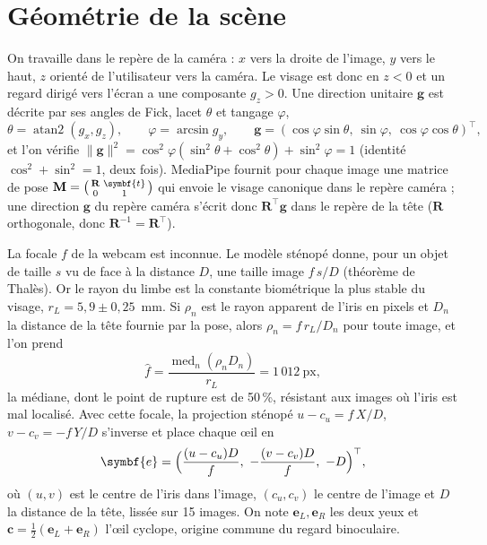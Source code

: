 \documentclass[10pt,a4paper]{article}
\newcommand{\vect}[1]{\symbf{#1}}
\newcommand{\T}{^{\top}}
\DeclareMathOperator{\med}{med}
\begin{document}
\section{Géométrie de la scène}\label{sec:geo}

On travaille dans le repère de la caméra : $x$ vers la droite de l'image, $y$ vers le haut, $z$ orienté de l'utilisateur vers la caméra. Le visage est donc en $z<0$ et un regard dirigé vers l'écran a une composante $g_z>0$. Une direction unitaire $\vect g$ est décrite par ses angles de Fick, lacet $\theta$ et tangage $\varphi$,
\begin{equation}
\theta=\operatorname{atan2}(g_x,g_z),\qquad \varphi=\arcsin g_y,\qquad
\vect g=(\cos\varphi\sin\theta,\ \sin\varphi,\ \cos\varphi\cos\theta)\T ,
\end{equation}
et l'on vérifie $\|\vect g\|^2=\cos^2\varphi(\sin^2\theta+\cos^2\theta)+\sin^2\varphi=1$ (identité $\cos^2+\sin^2=1$, deux fois). MediaPipe fournit pour chaque image une matrice de pose $\mathbf M=\begin{psmallmatrix}\mathbf R&\vect t\\0&1\end{psmallmatrix}$ qui envoie le visage canonique dans le repère caméra ; une direction $\vect g$ du repère caméra s'écrit donc $\mathbf R\T\vect g$ dans le repère de la tête ($\mathbf R$ orthogonale, donc $\mathbf R^{-1}=\mathbf R\T$).

La focale $f$ de la webcam est inconnue. Le modèle sténopé donne, pour un objet de taille $s$ vu de face à la distance $D$, une taille image $f\,s/D$ (théorème de Thalès). Or le rayon du limbe est la constante biométrique la plus stable du visage, $r_L=5{,}9\pm0{,}25$~mm. Si $\rho_n$ est le rayon apparent de l'iris en pixels et $D_n$ la distance de la tête fournie par la pose, alors $\rho_n=f\,r_L/D_n$ pour toute image, et l'on prend
\begin{equation}\label{eq:focal}
\hat f=\frac{\med_n(\rho_n D_n)}{r_L}=1\,012~\text{px},
\end{equation}
la médiane, dont le point de rupture est de 50\,\%, résistant aux images où l'iris est mal localisé. Avec cette focale, la projection sténopé $u-c_u=f\,X/D$, $v-c_v=-f\,Y/D$ s'inverse et place chaque œil en
\begin{equation}
\vect e=\Bigl(\frac{(u-c_u)D}{f},\ -\frac{(v-c_v)D}{f},\ -D\Bigr)\T ,
\end{equation}
où $(u,v)$ est le centre de l'iris dans l'image, $(c_u,c_v)$ le centre de l'image et $D$ la distance de la tête, lissée sur 15 images. On note $\vect e_L,\vect e_R$ les deux yeux et $\vect c=\tfrac12(\vect e_L+\vect e_R)$ l'œil cyclope, origine commune du regard binoculaire.
\end{document}
